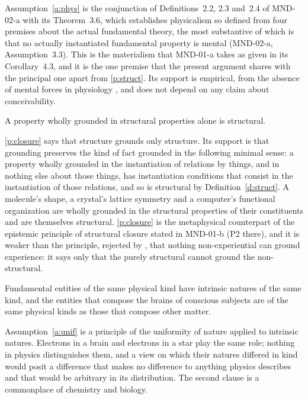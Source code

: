 \documentclass{situationist-preprint}
\begin{document}
Assumption~\ref{a:phys} is the conjunction of Definitions~2.2, 2.3 and~2.4 of MND-02-a with its Theorem~3.6, which establishes physicalism so defined from four premises about the actual fundamental theory, the most substantive of which is that no actually instantiated fundamental property is mental (MND-02-a, Assumption~3.3). This is the materialism that MND-01-a takes as given in its Corollary~4.3, and it is the one premise that the present argument shares with the principal one apart from \ref{p:struct}. Its support is empirical, from the absence of mental forces in physiology \citep{Papineau2001}, and does not depend on any claim about conceivability.

\begin{principle}\label{p:closure}
A property wholly grounded in structural properties alone is structural.
\end{principle}

\ref{p:closure} says that structure grounds only structure. Its support is that grounding preserves the kind of fact grounded in the following minimal sense: a property wholly grounded in the instantiation of relations by things, and in nothing else about those things, has instantiation conditions that consist in the instantiation of those relations, and so is structural by Definition~\ref{d:struct}. A molecule's shape, a crystal's lattice symmetry and a computer's functional organization are wholly grounded in the structural properties of their constituents and are themselves structural. \ref{p:closure} is the metaphysical counterpart of the epistemic principle of structural closure stated in MND-01-b (P2 there), and it is weaker than the principle, rejected by \citet{Strawson2006}, that nothing non-experiential can ground experience: it says only that the purely structural cannot ground the non-structural.

\begin{assumption}[Uniformity]\label{a:unif}
Fundamental entities of the same physical kind have intrinsic natures of the same kind, and the entities that compose the brains of conscious subjects are of the same physical kinds as those that compose other matter.
\end{assumption}

Assumption~\ref{a:unif} is a principle of the uniformity of nature applied to intrinsic natures. Electrons in a brain and electrons in a star play the same role; nothing in physics distinguishes them, and a view on which their natures differed in kind would posit a difference that makes no difference to anything physics describes and that would be arbitrary in its distribution. The second clause is a commonplace of chemistry and biology.
\end{document}
